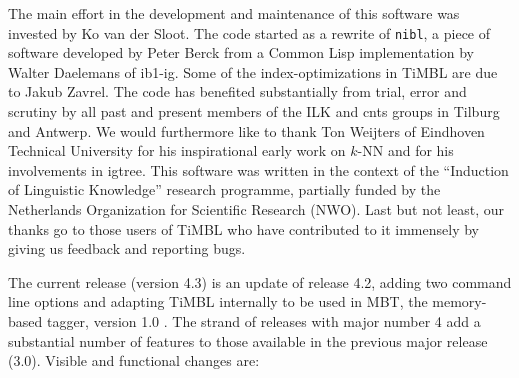 \documentclass{report}
\begin{document}
The main effort in the development and maintenance of this software
was invested by Ko van der Sloot. The code started as a rewrite of
{\tt nibl}, a piece of software developed by Peter Berck from a Common
Lisp implementation by Walter Daelemans of {\sc ib1-ig}. Some of the
index-optimizations in TiMBL are due to Jakub Zavrel. The code has
benefited substantially from trial, error and scrutiny by all past and
present members of the ILK and {\sc cnts} groups in Tilburg and
Antwerp. We would furthermore like to thank Ton Weijters of Eindhoven
Technical University for his inspirational early work on $k$-NN and
for his involvements in {\sc igtree}. This software was written in
the context of the ``Induction of Linguistic Knowledge'' research
programme, partially funded by the Netherlands Organization for
Scientific Research (NWO). Last but not least, our thanks go to those
users of TiMBL who have contributed to it immensely by giving us
feedback and reporting bugs.

The current release (version 4.3) is an update of release 4.2, adding
two command line options and adapting TiMBL internally to be used in
MBT, the memory-based tagger, version 1.0 \cite{Daelemans+02}. The
strand of releases with major number 4 add a substantial number of
features to those available in the previous major release
(3.0). Visible and functional changes are:
\end{document}
